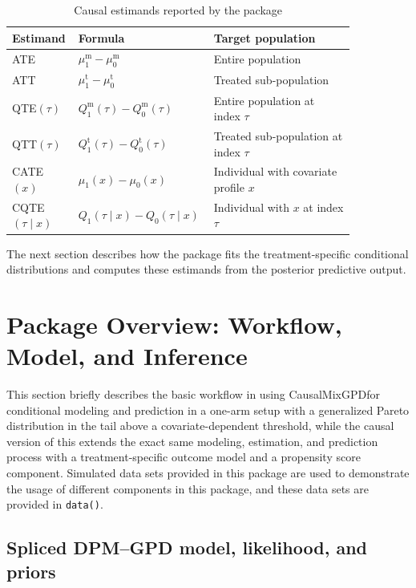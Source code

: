 \documentclass[article]{jss}\usepackage[]{graphicx}\usepackage[]{xcolor}
\DeclareRobustCommand{\pkg}[1]{\textsf{#1}}
\DeclareRobustCommand{\code}[1]{\nolinkurl{#1}}
\begin{document}
\begin{table}[H]
\centering
\small
\caption{Causal estimands reported by the package}
\label{tab:causal-estimands-main}
{
\renewcommand{\arraystretch}{1.15}
\begin{tabular}{
  @{}>{\raggedright\arraybackslash}p{0.15\linewidth}
  >{\centering\arraybackslash}p{0.30\linewidth}
  >{\raggedright\arraybackslash}p{0.40\linewidth}@{}
}
\toprule
Estimand & Formula & Target population \\
\midrule
ATE & $\mu_1^{\mathrm{m}}-\mu_0^{\mathrm{m}}$ & Entire population \\
ATT & $\mu_1^{\mathrm{t}}-\mu_0^{\mathrm{t}}$ & Treated sub-population \\
QTE$(\tau)$ & $Q_1^{\mathrm{m}}(\tau)-Q_0^{\mathrm{m}}(\tau)$ & Entire population at index $\tau$\\
QTT$(\tau)$ & $Q_1^{\mathrm{t}}(\tau)-Q_0^{\mathrm{t}}(\tau)$ & Treated sub-population at index $\tau$\\
CATE$(x)$ & $\mu_1(x)-\mu_0(x)$ & Individual with covariate profile $x$ \\
CQTE$(\tau\mid x)$ & $Q_1(\tau\mid x)-Q_0(\tau\mid x)$ & Individual with $x$ at index $\tau$\\
\bottomrule
\end{tabular}
}
\end{table}

The next section describes how the package fits the treatment-specific
conditional distributions and computes these estimands from the
posterior predictive output.


\section{Package Overview: Workflow, Model, and Inference}
\label{sec:overview}
This section briefly describes the basic workflow in using \pkg{CausalMixGPD}for conditional modeling and prediction in a one-arm setup with a generalized Pareto distribution in the tail above a covariate-dependent threshold, while the causal version of this extends the exact same modeling, estimation, and prediction process with a treatment-specific outcome model and a propensity score component. Simulated data sets provided in this package are used to demonstrate the usage of different components in this package, and these data sets are provided in \code{data()}.

\subsection{Spliced DPM--GPD model, likelihood, and priors}
\label{subsec:overview-model}
\end{document}
